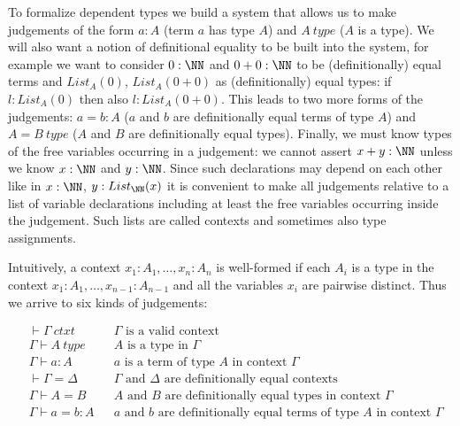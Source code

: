 To formalize dependent types we build a system that allows us to make
judgements of the form $a : A$ (term $a$ has type $A$) and $A~type$ ($A$ is a
type). We will also want a notion of definitional equality to be built into the
system, for example we want to consider $0 : \NN$ and $0 + 0 : \NN$ to be
(definitionally) equal terms and $List_A(0)$, $List_A(0 + 0)$ as
(definitionally) equal types: if $l : List_A(0)$ then also $l : List_A(0 + 0)$.
This leads to two more forms of the judgements: $a = b : A$ ($a$ and $b$ are
definitionally equal terms of type $A$) and $A = B~type$ ($A$ and $B$ are
definitionally equal types). Finally, we must know types of the free variables
occurring in a judgement: we cannot assert $x + y : \NN$ unless we know $x :
\NN$ and $y : \NN$. Since such declarations may depend on each other like in $x
: \NN$, $y : List_\NN(x)$ it is convenient to make all judgements relative to a
list of variable declarations including at least the free variables occurring
inside the judgement. Such lists are called contexts and sometimes also type
assignments.

Intuitively, a context $x_1 : A_1, \dots, x_n : A_n$ is well-formed if each
$A_i$ is a type in the context $x_1 : A_1, \dots, x_{n-1} : A_{n-1}$ and all
the variables $x_i$ are pairwise distinct. Thus we arrive to six kinds of
judgements:

\begin{align*}
  &\vdash \Gamma~ctxt && \text{$\Gamma$ is a valid context} \\
  &\Gamma \vdash A~type && \text{$A$ is a type in $\Gamma$} \\
  &\Gamma \vdash a : A && \text{$a$ is a term of type $A$ in context $\Gamma$} \\
  &\vdash \Gamma = \Delta && \text{$\Gamma$ and $\Delta$ are definitionally equal contexts} \\
  &\Gamma \vdash A = B && \text{$A$ and $B$ are definitionally equal types in context $\Gamma$} \\
  &\Gamma \vdash a = b : A && \text{$a$ and $b$ are definitionally equal terms of type $A$ in context $\Gamma$}
\end{align*}

